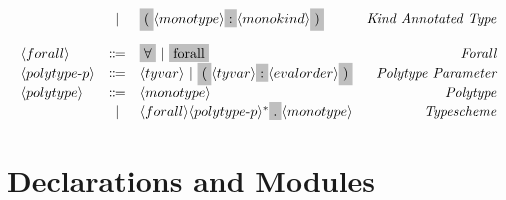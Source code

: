 \[\begin{array}{lclr}
    & | & \terminal{(} \nonterminal{monotype} \terminal{:} \nonterminal{monokind} \terminal{)} & \emph{Kind Annotated Type} \\[4mm]
    \nonterminal{forall} & \Coloneqq & \terminal{$\forall$}\ |\ \terminal{forall} & \emph{Forall} \\
    \nonterminal{polytype$-$p} & \Coloneqq & \nonterminal{tyvar}\ |\ \terminal{(} \nonterminal{tyvar} \terminal{:} \nonterminal{evalorder}\terminal{)} & \emph{Polytype Parameter} \\
    \nonterminal{polytype} & \Coloneqq & \nonterminal{monotype} & \emph{Polytype} \\
    & | & \nonterminal{forall} \nonterminal{polytype$-$p}^{\ast}\terminal{.} \nonterminal{monotype} & \emph{Typescheme} \\
  \end{array}
\]

\section{Declarations and Modules}

